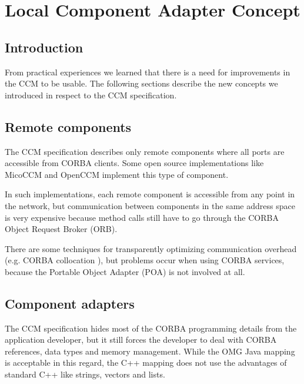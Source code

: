 \chapter{Local Component Adapter Concept}
\begin{flushright}
{\it }
\end{flushright}

\section{Introduction}
From practical experiences we learned that there is a need for improvements in
the CCM to be usable. The following sections describe the new concepts we
introduced in respect to the CCM specification.


\section{Remote components}

The CCM specification describes only remote components where all ports are
accessible from CORBA clients. Some open source implementations like MicoCCM
\cite{MicoCCM} and OpenCCM \cite{MarvieMerle2001} implement this type of
component.

In such implementations, each remote component is accessible from any point in
the network, but communication between components in the same address space is
very expensive because method calls still have to go through the CORBA Object
Request Broker (ORB).

There are some techniques for transparently optimizing communication overhead
(e.g. CORBA collocation \cite{ObjectInterconnections18, wang00optimizing}), but
problems occur when using CORBA services, because the Portable Object Adapter
(POA) is not involved at all.


\section{Component adapters}
The CCM specification hides most of the CORBA programming details from the
application developer, but it still forces the developer to deal with CORBA
references, data types and memory management. While the OMG Java mapping
\cite{OMGIDL2Java} is acceptable in this regard, the C++ mapping
\cite{OMGIDL2Cpp} does not use the advantages of standard C++ like strings,
vectors and lists.

